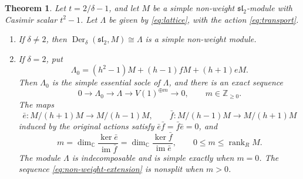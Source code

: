 \documentclass[11pt,reqno]{amsart}
\numberwithin{equation}{section}
\newcommand{\C}{\mathbb C}
\newcommand{\Z}{\mathbb Z}
\newcommand{\s}{\mathfrak{sl}_2}
\DeclareMathOperator{\Der}{Der}
\DeclareMathOperator{\im}{im}
\DeclareMathOperator{\rank}{rank}
\newtheorem{theorem}{Theorem}[section]
\theoremstyle{definition}
\theoremstyle{remark}
\begin{document}
\begin{theorem}\label{thm:non-weight}
Let \(t=2/\delta-1\), and let \(M\) be a simple non-weight
\(\s\)-module with Casimir scalar \(t^2-1\).
Let \(\Lambda\) be given by \eqref{eq:lattice}, with the action
\eqref{eq:transport}.
\begin{enumerate}
\item If \(\delta\ne2\), then \(\Der_\delta(\s,M)\cong\Lambda\)
is a simple non-weight module.

\item If \(\delta=2\), put
\begin{equation}\label{eq:Lambda0}
\Lambda_0=(h^2-1)M+(h-1)fM+(h+1)eM.
\end{equation}
Then \(\Lambda_0\) is the simple essential socle of \(\Lambda\),
and there is an exact sequence
\begin{equation}\label{eq:non-weight-extension}
0\longrightarrow\Lambda_0\longrightarrow\Lambda
\longrightarrow V(1)^{\oplus m}\longrightarrow0,
\qquad m\in\Z_{\ge0}.
\end{equation}
The maps
\begin{equation}\label{eq:fibers}
\bar e:M/(h+1)M\longrightarrow M/(h-1)M,\qquad
\bar f:M/(h-1)M\longrightarrow M/(h+1)M
\end{equation}
induced by the original actions satisfy
\(\bar e\bar f=\bar f\bar e=0\), and
\begin{equation}\label{eq:multiplicity}
m=\dim_\C\frac{\ker\bar e}{\im\bar f}
 =\dim_\C\frac{\ker\bar f}{\im\bar e},
\qquad 0\le m\le\rank_R M.
\end{equation}
The module \(\Lambda\) is indecomposable and is simple exactly
when \(m=0\). The sequence \eqref{eq:non-weight-extension}
is nonsplit when \(m>0\).
\end{enumerate}
\end{theorem}
\end{document}
